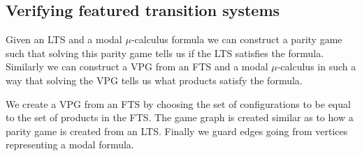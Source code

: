 \subsection{Verifying featured transition systems}
Given an LTS and a modal $\mu$-calculus formula we can construct a parity game such that solving this parity game tells us if the LTS satisfies the formula. Similarly we can construct a VPG from an FTS and a modal $\mu$-calculus in such a way that solving the VPG tells us what products satisfy the formula.

We create a VPG from an FTS by choosing the set of configurations to be equal to the set of products in the FTS. The game graph is created similar as to how a parity game is created from an LTS. Finally we guard edges going from vertices representing a modal formula.

